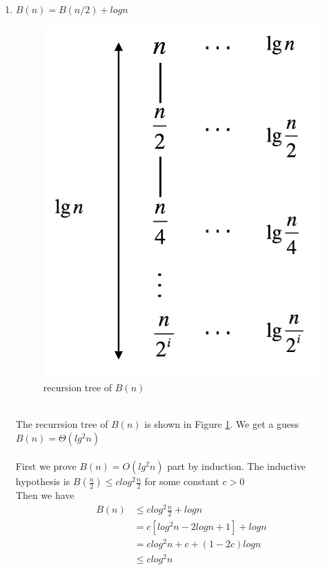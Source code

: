 \begin{enumerate}[label=(\alph*)]
	\item $B(n) = B(n/2) + logn$
	\begin{figure}[h]
	\centering
	\includegraphics[scale=0.28]{p3b}
	\caption{recursion tree of $B(n)$}
	\label{fig:p3b}
	\end{figure}\\
	The recurrsion tree of $B(n)$ is shown in Figure \ref{fig:p3b}. We get a guess $B(n) = \Theta(lg^2n)$\\\\
	First we prove $B(n) = O(lg^2n)$ part by induction. The inductive hypothesis is $B(\frac{n}{2}) \leq clog^2\frac{n}{2} $ for some constant $c > 0$\\
	Then we have
	\begin{align*}
	B(n) &\leq clog^2\frac{n}{2} + logn\\
	& = c[log^2n - 2logn + 1] + logn\\
	& = clog^2n + c + (1 - 2c)logn\\
	&\leq clog^2n 
	\end{align*}
	\\

\end{enumerate}
